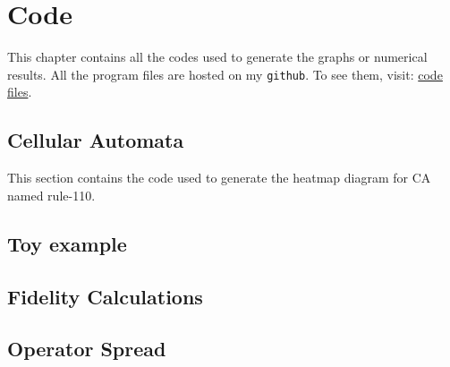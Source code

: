 \documentclass[11pt, oneside, listof=totoc]{scrbook}
\begin{document}
\chapter{Code}\label{appendix:code}

\noindent This chapter contains all the codes used to generate the graphs or numerical results. All the program files are hosted on my \texttt{github}. To see them, visit: \href{https://github.com/iamPiyushKrSingh/NIUS-Physics-20.2/tree/main/codes}{code files}.

\section[Classical Cellular Automata]{Cellular Automata}

This section contains the code used to generate the heatmap diagram for CA named rule-110.


\section{Toy example}







\section{Fidelity Calculations}



\section{Operator Spread}



\backmatter\printbibliography[heading=bibintoc, title=Bibliography]
\end{document}

